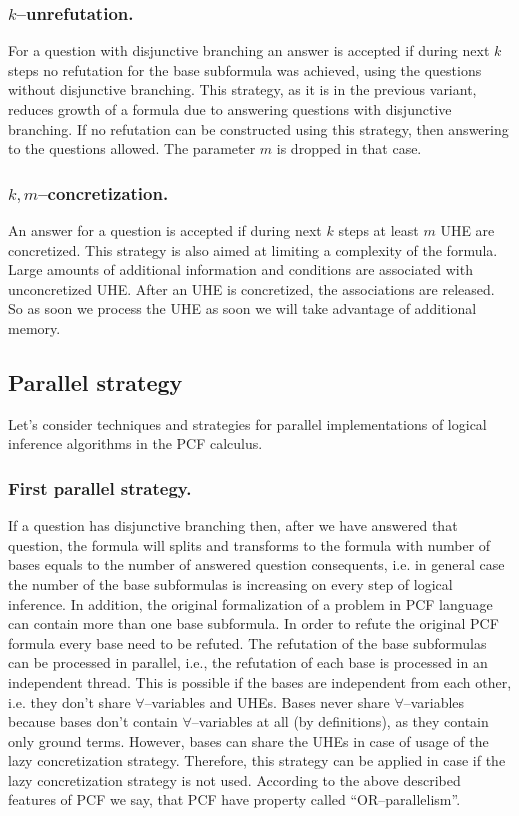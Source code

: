 \documentclass[runningheads,a4paper]{llncs}
\begin{document}
\subsubsection{$k$--unrefutation.}
For a question with disjunctive branching an answer is accepted if during next $k$ steps no refutation for the base subformula was achieved, using the questions without disjunctive branching. This strategy, as it is in the previous variant, reduces growth of a formula due to answering questions with disjunctive branching. If no refutation can be constructed using this strategy, then answering to the questions allowed. The parameter $m$ is dropped in that case.

\subsubsection{$k,m$--concretization.}
An answer for a question is accepted if during next $k$ steps at least $m$ UHE are concretized. This strategy is also aimed at limiting a complexity of the formula. Large amounts of additional information and conditions are associated with unconcretized UHE. After an UHE is concretized, the associations are released. So as soon we process the UHE as soon we will take advantage of additional memory.


\subsection{Parallel strategy}

Let's consider techniques and strategies for parallel implementations of logical inference algorithms in the PCF calculus.

\subsubsection{First parallel strategy.}
If a question has disjunctive branching then, after we have answered that question, the formula will splits and transforms to the formula with number of bases equals to the number of answered question consequents, i.e. in general case the number of the base subformulas is increasing on every step of logical inference. In addition, the original formalization of a problem in PCF language can contain more than one base subformula. In order to refute the original PCF formula every base need to be refuted. The refutation of the base subformulas can be processed in parallel, i.e., the refutation of each base is processed in an independent thread. This is possible if the bases are independent from each other, i.e. they don't share $\forall$--variables and UHEs. Bases never share $\forall$--variables because bases don't contain $\forall$--variables at all (by definitions), as they contain only ground terms. However, bases can share the UHEs in case of usage of the lazy concretization strategy. Therefore, this strategy can be applied in case if the lazy concretization strategy is not used. According to the above described features of PCF we say, that PCF have property called ``OR--parallelism''.
\end{document}
